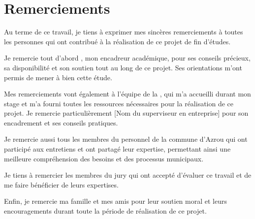 \chapter*{Remerciements}

Au terme de ce travail, je tiens à exprimer mes sincères remerciements à toutes les personnes qui ont contribué à la réalisation de ce projet de fin d'études.

Je remercie tout d'abord \textbf{\supervisor}, mon encadreur académique, pour ses conseils précieux, sa disponibilité et son soutien tout au long de ce projet. Ses orientations m'ont permis de mener à bien cette étude.

Mes remerciements vont également à l'équipe de la \textbf{\company}, qui m'a accueilli durant mon stage et m'a fourni toutes les ressources nécessaires pour la réalisation de ce projet. Je remercie particulièrement [Nom du superviseur en entreprise] pour son encadrement et ses conseils pratiques.

Je remercie aussi tous les membres du personnel de la commune d'Azrou qui ont participé aux entretiens et ont partagé leur expertise, permettant ainsi une meilleure compréhension des besoins et des processus municipaux.

Je tiens à remercier les membres du jury qui ont accepté d'évaluer ce travail et de me faire bénéficier de leurs expertises.

Enfin, je remercie ma famille et mes amis pour leur soutien moral et leurs encouragements durant toute la période de réalisation de ce projet.

\vfill
